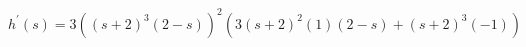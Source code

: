 $ \displaystyle h^{\prime}(s) = 3((s + 2)^3 (2 - s))^2 \left(3(s + 2)^2(1) (2 - s) + (s + 2)^3 (-1)\right) $